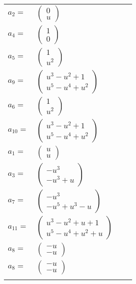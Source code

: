 \documentclass[1p]{elsarticle_modified}
\theoremstyle{definition}
\begin{document}
\begin{tabular}{m{7pt} m{180pt} m{7pt} m{180pt} }
\flushright $a_{2}=$&$\begin{pmatrix}0\\u\end{pmatrix}$ \\
\flushright $a_{4}=$&$\begin{pmatrix}1\\0\end{pmatrix}$ \\
\flushright $a_{5}=$&$\begin{pmatrix}1\\u^2\end{pmatrix}$ \\
\flushright $a_{9}=$&$\begin{pmatrix}u^3- u^2+1\\u^5- u^4+u^2\end{pmatrix}$ \\
\flushright $a_{6}=$&$\begin{pmatrix}1\\u^2\end{pmatrix}$ \\
\flushright $a_{10}=$&$\begin{pmatrix}u^3- u^2+1\\u^5- u^4+u^2\end{pmatrix}$ \\
\flushright $a_{1}=$&$\begin{pmatrix}u\\u\end{pmatrix}$ \\
\flushright $a_{3}=$&$\begin{pmatrix}- u^3\\- u^3+u\end{pmatrix}$ \\
\flushright $a_{7}=$&$\begin{pmatrix}- u^3\\- u^5+u^3- u\end{pmatrix}$ \\
\flushright $a_{11}=$&$\begin{pmatrix}u^3- u^2+u+1\\u^5- u^4+u^2+u\end{pmatrix}$ \\
\flushright $a_{8}=$&$\begin{pmatrix}- u\\- u\end{pmatrix}$\\ \flushright $a_{8}=$&$\begin{pmatrix}- u\\- u\end{pmatrix}$\\&\end{tabular}
\end{document}
